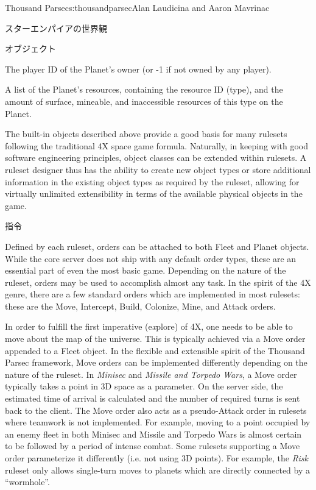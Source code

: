 \begin{aosachapter}{Thousand Parsec}{s:thousandparsec}{Alan Laudicina and Aaron Mavrinac}
\begin{aosasect1}{スターエンパイアの世界観}
\begin{aosasect2}{オブジェクト}
\begin{aosaitemize}

  \item The player ID of the Planet's owner (or -1 if not owned by any
  player).

  \item A list of the Planet's resources, containing the resource ID
  (type), and the amount of surface, mineable, and inaccessible
  resources of this type on the Planet.

\end{aosaitemize}

The built-in objects described above provide a good basis for many
rulesets following the traditional 4X space game formula. Naturally,
in keeping with good software engineering principles, object classes
can be extended within rulesets. A ruleset designer thus has the
ability to create new object types or store additional information in
the existing object types as required by the ruleset, allowing for
virtually unlimited extensibility in terms of the available physical
objects in the game.

\end{aosasect2}

\begin{aosasect2}{指令}

Defined by each ruleset, orders can be attached to both Fleet and
Planet objects. While the core server does not ship with any default
order types, these are an essential part of even the most basic
game. Depending on the nature of the ruleset, orders may be used to
accomplish almost any task. In the spirit of the 4X genre, there are a
few standard orders which are implemented in most rulesets: these are
the Move, Intercept, Build, Colonize, Mine, and Attack orders.

In order to fulfill the first imperative (e\emph{x}plore) of 4X, one
needs to be able to move about the map of the universe. This is
typically achieved via a Move order appended to a Fleet object. In the
flexible and extensible spirit of the Thousand Parsec framework, Move
orders can be implemented differently depending on the nature of the
ruleset. In \emph{Minisec} and \emph{Missile and Torpedo Wars}, a Move
order typically takes a point in 3D space as a parameter. On the
server side, the estimated time of arrival is calculated and the
number of required turns is sent back to the client. The Move order
also acts as a pseudo-Attack order in rulesets where teamwork is not
implemented. For example, moving to a point occupied by an enemy fleet
in both Minisec and Missile and Torpedo Wars is almost certain to be
followed by a period of intense combat. Some rulesets supporting a Move
order parameterize it differently (i.e. not using 3D points). For
example, the \emph{Risk} ruleset only allows single-turn moves to
planets which are directly connected by a ``wormhole''.


\end{aosasect2}
\end{aosasect1}
\end{aosachapter}

